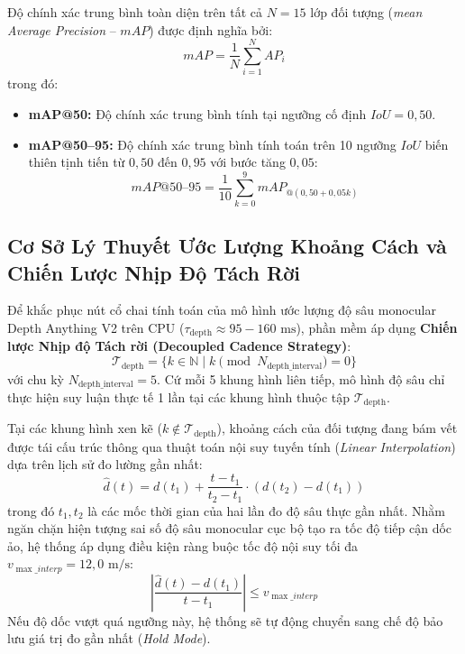 \documentclass[12pt,a4paper]{article}
\begin{document}
Độ chính xác trung bình toàn diện trên tất cả $N = 15$ lớp đối tượng (\textit{mean Average Precision} -- $mAP$) được định nghĩa bởi:
\begin{equation}
\label{eq:map_metric}
mAP = \frac{1}{N} \sum_{i=1}^N AP_i
\end{equation}
trong đó:
\begin{itemize}
    \item \textbf{mAP@50:} Độ chính xác trung bình tính tại ngưỡng cố định $IoU = 0,50$.
    \item \textbf{mAP@50--95:} Độ chính xác trung bình tính toán trên 10 ngưỡng $IoU$ biến thiên tịnh tiến từ $0,50$ đến $0,95$ với bước tăng $0,05$:
    \begin{equation}
    \label{eq:map5095_metric}
    mAP@50\text{--}95 = \frac{1}{10} \sum_{k=0}^9 mAP_{@(0,50 + 0,05k)}
    \end{equation}
\end{itemize}

\subsection{Cơ Sở Lý Thuyết Ước Lượng Khoảng Cách và Chiến Lược Nhịp Độ Tách Rời}
Để khắc phục nút cổ chai tính toán của mô hình ước lượng độ sâu monocular Depth Anything V2 trên CPU ($\tau_{\text{depth}} \approx 95-160\text{ ms}$), phần mềm áp dụng \textbf{Chiến lược Nhịp độ Tách rời (Decoupled Cadence Strategy)}:
\begin{equation}
\label{eq:depth_cadence}
\mathcal{T}_{\text{depth}} = \{ k \in \mathbb{N} \mid k \pmod{N_{\text{depth\_interval}}} = 0 \}
\end{equation}
với chu kỳ $N_{\text{depth\_interval}} = 5$. Cứ mỗi 5 khung hình liên tiếp, mô hình độ sâu chỉ thực hiện suy luận thực tế 1 lần tại các khung hình thuộc tập $\mathcal{T}_{\text{depth}}$.

Tại các khung hình xen kẽ ($k \notin \mathcal{T}_{\text{depth}}$), khoảng cách của đối tượng đang bám vết được tái cấu trúc thông qua thuật toán nội suy tuyến tính (\textit{Linear Interpolation}) dựa trên lịch sử đo lường gần nhất:
\begin{equation}
\label{eq:depth_interp}
\hat{d}(t) = d(t_1) + \frac{t - t_1}{t_2 - t_1} \cdot \left( d(t_2) - d(t_1) \right)
\end{equation}
trong đó $t_1, t_2$ là các mốc thời gian của hai lần đo độ sâu thực gần nhất. Nhằm ngăn chặn hiện tượng sai số độ sâu monocular cục bộ tạo ra tốc độ tiếp cận dốc ảo, hệ thống áp dụng điều kiện ràng buộc tốc độ nội suy tối đa $v_{\max\_interp} = 12,0\text{ m/s}$:
\begin{equation}
\label{eq:depth_clamp}
\left| \frac{\hat{d}(t) - d(t_1)}{t - t_1} \right| \le v_{\max\_interp}
\end{equation}
Nếu độ dốc vượt quá ngưỡng này, hệ thống sẽ tự động chuyển sang chế độ bảo lưu giá trị đo gần nhất (\textit{Hold Mode}).
\end{document}
